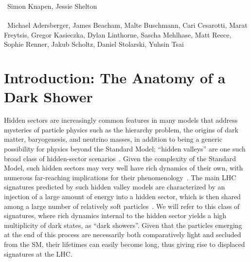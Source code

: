 ~Simon Knapen, Jessie Shelton \\
\text{ \; }\\
~Michael Adersberger, James Beacham, Malte Buschmann, Cari Cesarotti, Marat Freytsis, Gregor Kasieczka, Dylan Linthorne,  Sascha Mehlhase,  Matt Reece, Sophie Renner, Jakub Scholtz,  Daniel Stolarski, Yuhsin Tsai 
\text{ \; }\\

\section{Introduction: The Anatomy of a Dark Shower}
\label{sec:darkshowerintro}

Hidden sectors are increasingly common features in many models that address mysteries of particle physics such as the hierarchy problem, the origins of dark matter, baryogenesis, and neutrino masses, in addition to being a generic possibility for physics beyond the Standard Model; ``hidden valleys'' are one such broad class of hidden-sector scenarios~\cite{Strassler:2006im,Han:2007ae}. Given the complexity of the Standard Model, such hidden sectors may very well have rich dynamics of their own, with numerous far-reaching implications for their phenomenology~\cite{Strassler:2006ri,Strassler:2006qa,Strassler:2008bv,Strassler:2008fv,Juknevich:2009ji}. The main LHC signatures predicted by such hidden valley models are characterized by an injection of a large amount of energy into a hidden sector, which is then shared among a large number of relatively soft particles~\cite{Strassler:2008bv}. We will refer to this class of signatures, where rich dynamics internal to the hidden sector yields a high multiplicity of dark states, as ``dark showers''. Given that the particles emerging at the end of this process are necessarily both comparatively light and secluded from the SM, their lifetimes can easily become long, thus giving rise to displaced signatures at the LHC.

